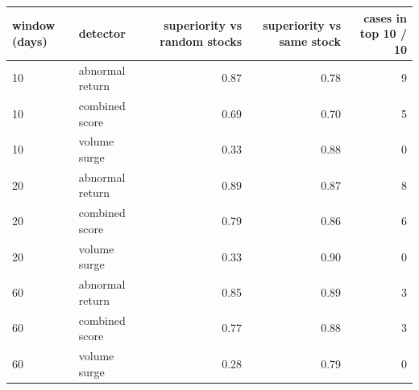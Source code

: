 \begin{tabular}{llrrr}
\toprule
window (days) & detector & superiority vs random stocks & superiority vs same stock & cases in top 10 / 10 \\
\midrule
10 & abnormal return & 0.87 & 0.78 & 9 \\
10 & combined score & 0.69 & 0.70 & 5 \\
10 & volume surge & 0.33 & 0.88 & 0 \\
20 & abnormal return & 0.89 & 0.87 & 8 \\
20 & combined score & 0.79 & 0.86 & 6 \\
20 & volume surge & 0.33 & 0.90 & 0 \\
60 & abnormal return & 0.85 & 0.89 & 3 \\
60 & combined score & 0.77 & 0.88 & 3 \\
60 & volume surge & 0.28 & 0.79 & 0 \\
\bottomrule
\end{tabular}
